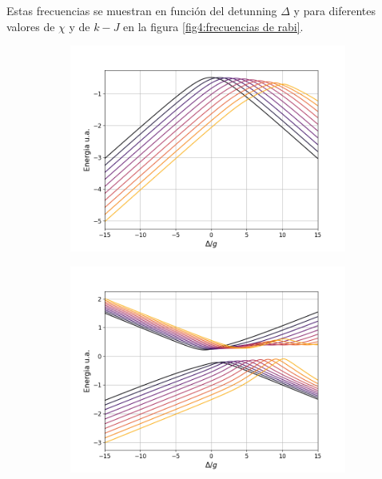 Estas frecuencias se muestran en función del detunning $\Delta$ y para diferentes valores de $\chi$ y de $k-J$ en la figura \ref{fig4:frecuencias de rabi}.
\begin{figure}
    \centering
    \begin{subfigure}{0.49\textwidth}
        \includegraphics[width=\textwidth]{figuras/ch4/omega12 2d chi.png}
        \caption{}
        \label{fig4:rabi 1 chi}
    \end{subfigure}
    \hfill
    \begin{subfigure}{0.49\textwidth}
        \includegraphics[width=\textwidth]{figuras/ch4/omega23 2d chi.png}
        \caption{}
        \label{fig4:rabi 2 chi}
    \end{subfigure}

\end{figure}
